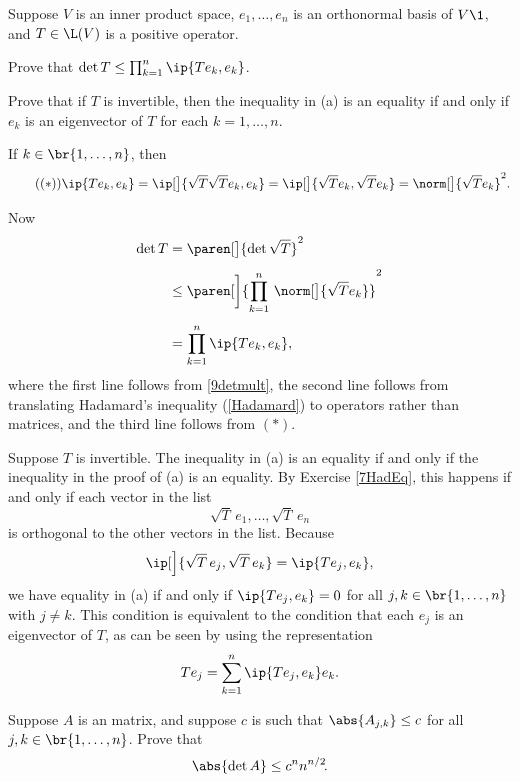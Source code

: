\exercise
Suppose $V$ is an inner product space, $e_1, \ldots, e_n$ is an orthonormal basis of $V\1$, and $T \in \L(V)$ is a positive operator.
\begin{subtheorem}
\item
Prove that $\det T \le \prod_{k=1}^n \ip{Te_k, e_k}$.
\item
Prove that if $T$ is invertible, then the inequality in (a) is an equality if and only if $e_k$ is an eigenvector of $T$ for each
$k = 1, \ldots, n$.
\end{subtheorem}

\begin{Solution}
\begin{subtheorem}
\item
If $k \in \br{1, \ldots, n}$, then
\[ \tag{$(*)$}
\ip{Te_k, e_k} = \ip[\big]{\sqrt{T} \sqrt{T} e_k, e_k} = \ip[\big]{\sqrt{T}e_k, \sqrt{T}e_k} = \norm[\big]{\sqrt{T}e_k}^2.
\]

Now
\begin{align*}
\det T &= \paren[\big]{ \det \sqrt{T} }^2 \\[4bp]
&\le \paren[\bigg]{ \prod_{k=1}^n \, \norm[\big]{ \sqrt{T} e_k} }^2 \\[4bp]
&= \prod_{k=1}^n \ip{Te_k, e_k},
\end{align*}
where the first line follows from \ref{9detmult}, the second line follows from translating Hadamard's inequality (\ref{Hadamard}) to operators rather than matrices, and the third line follows from $(*)$.

\item
Suppose $T$ is invertible. The inequality in (a) is an equality if and only if the inequality in the proof of (a) is an equality. By Exercise \ref{7HadEq}, this happens if and only if each vector in the list
\[
\sqrt{T} \, e_1, \ldots, \sqrt{T} \, e_n
\]
is orthogonal to the other vectors in the list. Because
\[
\ip[\Big]{ \sqrt{T} \, e_j , \sqrt{T} \, e_k } = \ip{Te_j, e_k},
\]
we have equality in (a) if and only if $\ip{Te_j, e_k} = 0$ for all $j, k \in \br{1, \ldots, n}$ with $j \ne k$. This condition is equivalent to the condition that each $e_j$ is an eigenvector of $T$, as can be seen by using the representation
\[
Te_j = \sum_{k=1}^n \ip{Te_j, e_k} e_k.
\]
\end{subtheorem}
\end{Solution}

\exercise
Suppose $A$ is an  matrix, and suppose $c$ is such that $\abs{A_{j,k}} \le c$ for all $j, k \in \br{1, \ldots, n}$. Prove that \label{2Had}
\[
\abs{\det A} \le c^n n^{n/2}\!.
\]
\exercisedisplayend
{} %

